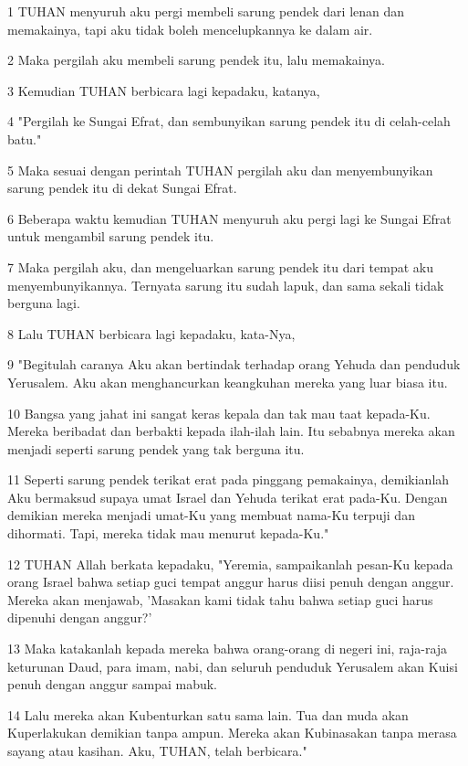 \par 1 TUHAN menyuruh aku pergi membeli sarung pendek dari lenan dan memakainya, tapi aku tidak boleh mencelupkannya ke dalam air.
\par 2 Maka pergilah aku membeli sarung pendek itu, lalu memakainya.
\par 3 Kemudian TUHAN berbicara lagi kepadaku, katanya,
\par 4 "Pergilah ke Sungai Efrat, dan sembunyikan sarung pendek itu di celah-celah batu."
\par 5 Maka sesuai dengan perintah TUHAN pergilah aku dan menyembunyikan sarung pendek itu di dekat Sungai Efrat.
\par 6 Beberapa waktu kemudian TUHAN menyuruh aku pergi lagi ke Sungai Efrat untuk mengambil sarung pendek itu.
\par 7 Maka pergilah aku, dan mengeluarkan sarung pendek itu dari tempat aku menyembunyikannya. Ternyata sarung itu sudah lapuk, dan sama sekali tidak berguna lagi.
\par 8 Lalu TUHAN berbicara lagi kepadaku, kata-Nya,
\par 9 "Begitulah caranya Aku akan bertindak terhadap orang Yehuda dan penduduk Yerusalem. Aku akan menghancurkan keangkuhan mereka yang luar biasa itu.
\par 10 Bangsa yang jahat ini sangat keras kepala dan tak mau taat kepada-Ku. Mereka beribadat dan berbakti kepada ilah-ilah lain. Itu sebabnya mereka akan menjadi seperti sarung pendek yang tak berguna itu.
\par 11 Seperti sarung pendek terikat erat pada pinggang pemakainya, demikianlah Aku bermaksud supaya umat Israel dan Yehuda terikat erat pada-Ku. Dengan demikian mereka menjadi umat-Ku yang membuat nama-Ku terpuji dan dihormati. Tapi, mereka tidak mau menurut kepada-Ku."
\par 12 TUHAN Allah berkata kepadaku, "Yeremia, sampaikanlah pesan-Ku kepada orang Israel bahwa setiap guci tempat anggur harus diisi penuh dengan anggur. Mereka akan menjawab, 'Masakan kami tidak tahu bahwa setiap guci harus dipenuhi dengan anggur?'
\par 13 Maka katakanlah kepada mereka bahwa orang-orang di negeri ini, raja-raja keturunan Daud, para imam, nabi, dan seluruh penduduk Yerusalem akan Kuisi penuh dengan anggur sampai mabuk.
\par 14 Lalu mereka akan Kubenturkan satu sama lain. Tua dan muda akan Kuperlakukan demikian tanpa ampun. Mereka akan Kubinasakan tanpa merasa sayang atau kasihan. Aku, TUHAN, telah berbicara."
